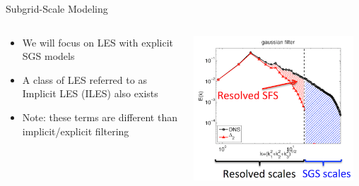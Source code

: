 \begin{frame}{Subgrid-Scale Modeling}

\begin{columns}[T]
    \begin{column}{.6\textwidth}
      \begin{minipage}[c][.6\textheight][c]{\linewidth}
      \begin{itemize}
      \item We will focus on LES with explicit SGS models
      \item A class of LES referred to as Implicit LES (ILES) also exists
      \item Note: these terms are different than implicit/explicit filtering
      \end{itemize}
      \end{minipage}
    \end{column}
    \begin{column}{.6\textwidth}
    \includegraphics[width=0.95\textwidth]{decomp1}
    \end{column}
  \end{columns}
\end{frame}


